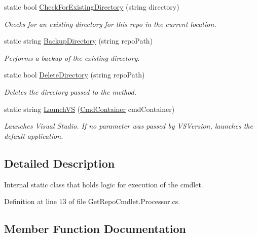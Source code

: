 \begin{DoxyCompactItemize}
static bool \mbox{\hyperlink{class_get_repo_cmdlet_1_1_processor_ace9c1d574b3758f94c8cf65e7fcddbf3}{Check\+For\+Existing\+Directory}} (string directory)
\begin{DoxyCompactList}\small\item\em Checks for an existing directory for this repo in the current location. \end{DoxyCompactList}\item 
static string \mbox{\hyperlink{class_get_repo_cmdlet_1_1_processor_ae0c9a18121e39f1ee3c183d08f7bf0b2}{Backup\+Directory}} (string repo\+Path)
\begin{DoxyCompactList}\small\item\em Performs a backup of the existing directory. \end{DoxyCompactList}\item 
static bool \mbox{\hyperlink{class_get_repo_cmdlet_1_1_processor_ae5f7bb67f8595174379a2cb144ae22c3}{Delete\+Directory}} (string repo\+Path)
\begin{DoxyCompactList}\small\item\em Deletes the directory passed to the method. \end{DoxyCompactList}\item 
static string \mbox{\hyperlink{class_get_repo_cmdlet_1_1_processor_a0d3e38fbd41a8e6bdfbc62dcf4656e90}{Launch\+VS}} (\mbox{\hyperlink{class_get_repo_cmdlet_1_1_cmd_container}{Cmd\+Container}} cmd\+Container)
\begin{DoxyCompactList}\small\item\em Launches Visual Studio. If no parameter was passed by V\+S\+Version, launches the default application. \end{DoxyCompactList}\end{DoxyCompactItemize}


\subsection{Detailed Description}
Internal static class that holds logic for execution of the cmdlet. 



Definition at line 13 of file Get\+Repo\+Cmdlet.\+Processor.\+cs.



\subsection{Member Function Documentation}
\mbox{\label{class_get_repo_cmdlet_1_1_processor_ae0c9a18121e39f1ee3c183d08f7bf0b2}} 
